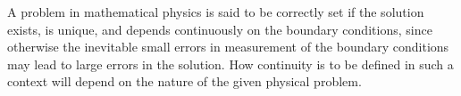 
\begin{sourcebox}
A problem in mathematical physics is said to be correctly set if the solution exists, is unique, and depends continuously on the boundary conditions, since otherwise the inevitable small errors in measurement of the boundary conditions may lead to large errors in the solution. How continuity is to be defined in such a context will depend on the nature of the given physical problem.
\end{sourcebox}

